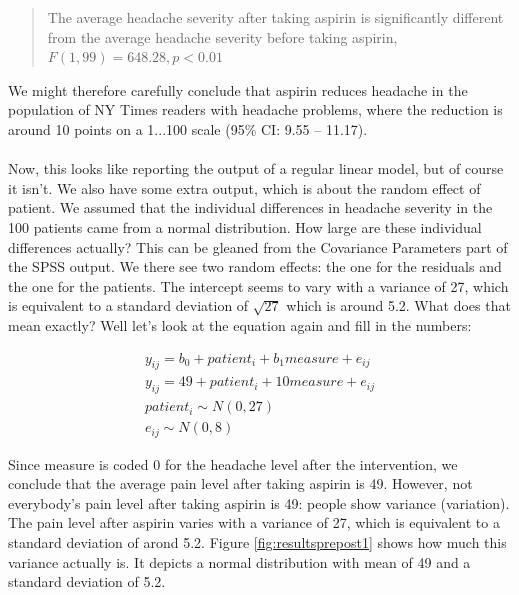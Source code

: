 \documentclass[]{book}\usepackage[]{graphicx}\usepackage[]{color}
\begin{document}
\begin{quote}
{The average headache severity after taking aspirin is significantly different from the average headache severity before taking aspirin, $F(1,99) = 648.28, p < 0.01$}\end{quote}


We might therefore carefully conclude that aspirin reduces headache in the population of NY Times readers with headache problems, where the reduction is around 10 points on a 1...100 scale (95\% CI: 9.55 -- 11.17). 
\\
\\
Now, this looks like reporting the output of a regular linear model, but of course it isn't. We also have some extra output, which is about the random effect of patient. We assumed that the individual differences in headache severity in the 100 patients came from a normal distribution. How large are these individual differences actually? This can be gleaned from the Covariance Parameters part of the SPSS output. We there see two random effects: the one for the residuals and the one for the patients. The intercept seems to vary with a variance of 27, which is equivalent to a standard deviation of $\sqrt{27}$ which is around 5.2. What does that mean exactly? Well let's look at the equation again and fill in the numbers:

\begin{eqnarray}
y_{ij} = b_0 + patient_i + b_1 measure + e_{ij} \\
y_{ij} = 49 + patient_i + 10 measure + e_{ij} \\
patient_i \sim N(0, 27)\\
e_{ij} \sim N(0, 8)
\end{eqnarray}

Since measure is coded 0 for the headache level after the intervention, we conclude that the average pain level after taking aspirin is 49. However, not everybody's pain level after taking aspirin is 49: people show variance (variation). The pain level after aspirin varies with a variance of 27, which is equivalent to a standard deviation of arond 5.2. Figure \ref{fig:resultsprepost1} shows how much this variance actually is. It depicts a normal distribution with mean of 49 and a standard deviation of 5.2.
\end{document}
